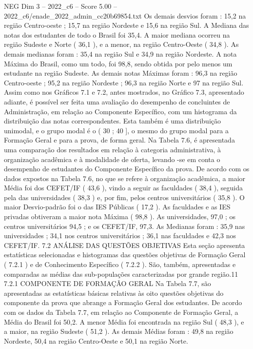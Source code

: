 \begin{textsample}{NEG Dim 3 – 2022\_c6 – Score 5.00 – 2022\_c6/enade\_2022\_admin\_cc20b69854.txt}
Os demais desvios foram : 15,2 na região Centro-oeste ; 15,7 na região Nordeste e 15,6 na região Sul.
A Mediana das notas dos estudantes de todo o Brasil foi 35,4.
A maior mediana ocorreu na região Sudeste e Norte ( 36,1 ), e a menor, na região Centro-Oeste ( 34,8 ).
As demais medianas foram : 35,4 na região Sul e 34,9 na região Nordeste.
A nota Máxima do Brasil, como um todo, foi 98,8, sendo obtida por pelo menos um estudante na região Sudeste.
As demais notas Máximas foram : 96,3 na região Centro-oeste ; 95,2 na região Nordeste ; 96,3 na região Norte e 97 na região Sul.
Assim como nos Gráficos 7.1 e 7.2, antes mostrados, no Gráfico 7.3, apresentado adiante, é possível ser feita uma avaliação do desempenho de concluintes de Administração, em relação ao Componente Específico, com um histograma da distribuição das notas correspondentes.
Esta também é uma distribuição unimodal, e o grupo modal é o ( 30 ; 40 ], o mesmo do grupo modal para a Formação Geral e para a prova, de forma geral.
Na Tabela 7.6, é apresentada uma comparação dos resultados em relação à categoria administrativa, à organização acadêmica e à modalidade de oferta, levando -se em conta o desempenho de estudantes do Componente Específico da prova.
De acordo com os dados expostos na Tabela 7.6, no que se refere à organização acadêmica, a maior Média foi dos CEFET/IF ( 43,6 ), vindo a seguir as faculdades ( 38,4 ), seguida pela das universidades ( 38,3 ) e, por fim, pelos centros universitários ( 35,8 ).
O maior Desvio-padrão foi o das IES Públicas ( 17,2 ).
As faculdades e as IES privadas obtiveram a maior nota Máxima ( 98,8 ).
As universidades, 97,0 ; os centros universitários 94,5 ; e os CEFET/IF, 97,3.
As Medianas foram : 35,9 nas universidades ; 34,1 nos centros universitários ; 36,1 nas faculdades e 42,3 nos CEFET/IF. 7.2 ANÁLISE DAS QUESTÕES OBJETIVAS Esta seção apresenta estatísticas selecionadas e histogramas das questões objetivas de Formação Geral ( 7.2.1 ) e de Conhecimento Específico ( 7.2.2 ).
São, também, apresentadas e comparadas as médias das sub-populações caracterizadas por grande região.11 7.2.1 COMPONENTE DE FORMAÇÃO GERAL Na Tabela 7.7, são apresentadas as estatísticas básicas relativas às oito questões objetivas do componente da prova que abrange a Formação Geral dos estudantes.
De acordo com os dados da Tabela 7.7, em relação ao Componente de Formação Geral, a Média do Brasil foi 50,2.
A menor Média foi encontrada na região Sul ( 48,3 ), e a maior, na região Sudeste ( 51,2 ).
As demais Médias foram : 49,8 na região Nordeste, 50,4 na região Centro-Oeste e 50,1 na região Norte.

\end{textsample}
